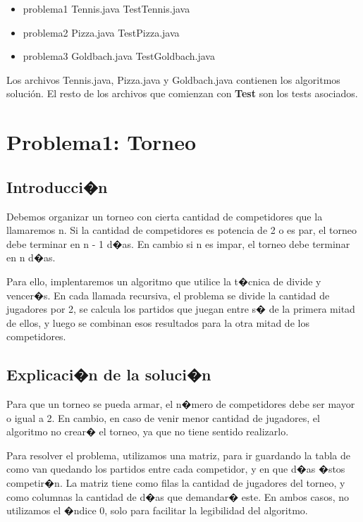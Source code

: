 \documentclass[11pt, a4paper, spanish]{article}
\begin{document}
\begin{itemize}
	\item problema1
		\subitem Tennis.java
		\subitem TestTennis.java
	\item problema2
		\subitem Pizza.java
		\subitem TestPizza.java
	\item problema3
		\subitem Goldbach.java
		\subitem TestGoldbach.java
\end{itemize}

	Los archivos Tennis.java, Pizza.java y Goldbach.java contienen los algoritmos soluci\'on.
	El resto de los archivos que comienzan con \textbf{Test} son los tests asociados.

\newpage

%

\section{Problema1: Torneo}
\label{sec:problema3}
	\subsection{Introducci�n}
	
	  Debemos organizar un torneo con cierta cantidad de competidores que la llamaremos n. Si la cantidad de competidores es potencia de 2 o es par, el torneo debe terminar en n - 1 d�as. En cambio si n es impar, el torneo debe terminar en n d�as.
	  
		Para ello, implentaremos un algoritmo que utilice la t�cnica de divide y vencer�s. En cada llamada recursiva, el problema se divide la cantidad de jugadores por 2, se calcula los partidos que juegan entre s� de la primera mitad de ellos, y luego se combinan esos resultados para la otra mitad de los competidores.

	\subsection{Explicaci�n de la soluci�n}
	
	Para que un torneo se pueda armar, el n�mero de competidores debe ser mayor o igual a 2. En cambio, en caso de venir menor cantidad de jugadores, el algoritmo no crear� el torneo, ya que no tiene sentido realizarlo. 
	
	Para resolver el problema, utilizamos una matriz, para ir guardando la tabla de como van quedando los partidos entre cada competidor, y en que d�as �stos competir�n. La matriz tiene como filas la cantidad de jugadores del torneo, y como columnas la cantidad de d�as que demandar� este. En ambos casos, no utilizamos el �ndice 0, solo para facilitar la legibilidad del algoritmo.
	
\end{document}
